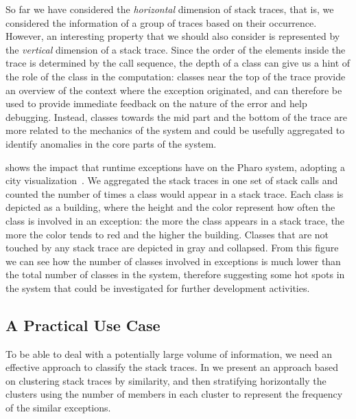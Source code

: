 So far we have considered the \emph{horizontal} dimension of stack traces, that is, we considered the information of a group of traces based on their occurrence. However, an interesting property that we should also consider is represented by the \emph{vertical} dimension of a stack trace. Since the order of the elements inside the trace is determined by the call sequence, the depth of a class can give us a hint of the role of the class in the computation: classes near the top of the trace provide an overview of the context where the exception originated, and can therefore be used to provide immediate feedback on the nature of the error and help debugging. Instead, classes towards the mid part and the bottom of the trace are more related to the mechanics of the system and could be usefully aggregated to identify anomalies in the core parts of the system.

 shows the impact that runtime exceptions have on the Pharo system, adopting a city visualization~\cite{Wett2011a}. We aggregated the stack traces in one set of stack calls and counted the number of times a class would appear in a stack trace. Each class is depicted as a building, where the height and the color represent how often the class is involved in an exception: the more the class appears in a stack trace, the more the color tends to red and the higher the building. Classes that are not touched by any stack trace are depicted in gray and collapsed. From this figure we can see how the number of classes involved in exceptions is much lower than the total number of classes in the system, therefore suggesting some hot spots in the system that could be investigated for further development activities.

\subsection{A Practical Use Case}

To be able to deal with a potentially large volume of information, we need an effective approach to classify the stack traces. In  we present an approach based on clustering stack traces by similarity, and then stratifying horizontally the clusters using the number of members in each cluster to represent the frequency of the similar exceptions.

